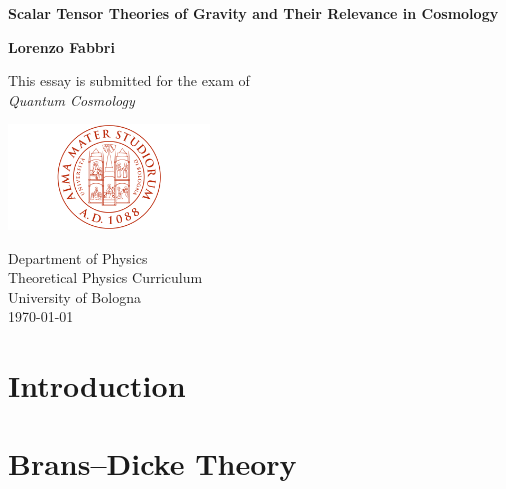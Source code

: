 \documentclass[a4paper,12pt,oneside,customfont,custombib,PageStyleII]{Settings/PhDThesisPSnPDF}
\begin{document}
\begin{titlepage}
    \begin{center}
        \vspace*{1cm}
            
        \Huge
        \textbf{Scalar Tensor Theories of Gravity and Their Relevance in Cosmology}
            
        \vspace{4cm}
        \Large    
        \textbf{Lorenzo Fabbri}
            
        \vfill
        \large   
        This essay is submitted for the exam of\\
        \textit{Quantum Cosmology}
            
        \vspace{0.8cm}
            
        \includegraphics[width=0.4\textwidth]{Graphics/UniversityCrest.png}
            
        \large
        Department of Physics\\
        Theoretical Physics Curriculum\\
        University of Bologna\\
        \today
            
    \end{center}
\end{titlepage}

\begin{spacing}{1.3}
    \tableofcontents
\end{spacing}

\mainmatter

\chapter*{Introduction}\label{chap:Introduction}


\chapter{Brans–Dicke Theory}\label{chap:chapter1}



\end{document}
